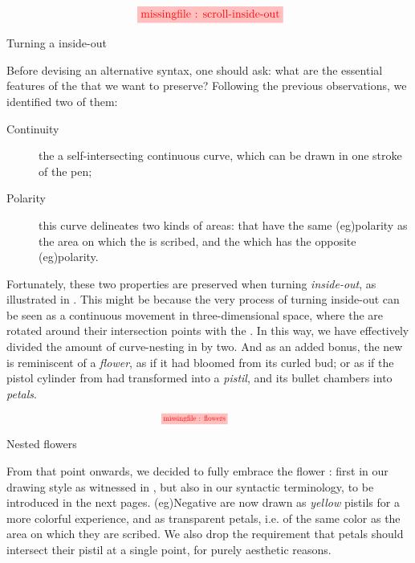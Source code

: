 \begin{scope}
\begin{marginfigure}
  $$
  \tikzfig{1}{0.4}{scroll-inside-out}
  $$
  \caption{Turning a  inside-out}
\end{marginfigure}

Before devising an alternative syntax, one should ask: what are the essential
features of the  that we want to preserve? Following
the previous observations, we identified two of them:
\begin{description}
  \item[Continuity] the  a self-intersecting
  continuous curve, which can be drawn in one stroke of the pen;
  \item[Polarity] this curve delineates two kinds of areas:  that have
  the same \kl(eg){polarity} as the area on which the  is scribed, and the  which has the opposite
  \kl(eg){polarity}.
\end{description}

Fortunately, these two properties are preserved when turning 
\emph{inside-out}, as illustrated in . This might be
because the very process of turning inside-out can be seen as a continuous
movement in three-dimensional space, where the  are rotated around their
intersection points with the . In this way, we have effectively divided
the amount of curve-nesting in  by two. And as an
added bonus, the new  is reminiscent of a \emph{flower}, as if it had
bloomed from its curled bud; or as if the pistol cylinder from
 had transformed into a \emph{pistil}, and its bullet
chambers into \emph{petals}.

\begin{marginfigure}
  $$
  \!\!\!\!
  \!\!\!\!
  \!\!\!\!
  \!\!\!\!
  \stkfig{0.65}{flowers}
  $$
  \vspace{-3em}
  \caption{Nested flowers}
\end{marginfigure}

From that point onwards, we decided to fully embrace the flower :
first in our drawing style as witnessed in , but also in our
syntactic terminology, to be introduced in the next pages. \kl(eg){Negative}
 are now drawn as \emph{yellow} pistils for a more colorful experience,
and  as transparent petals, i.e. of the same color as the area on which
they are scribed. We also drop the requirement that petals should intersect
their pistil at a single point, for purely aesthetic reasons.


\end{scope}
